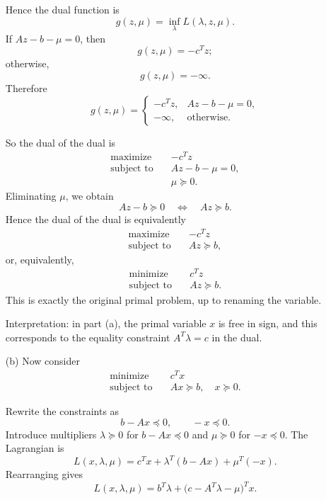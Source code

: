 \documentclass[11pt,letter,notitlepage]{article}
\theoremstyle{definition}
\begin{document}
\begin{solution}
\begin{enumerate}
    Hence the dual function is
    \[
    g(z,\mu)=\inf_\lambda L(\lambda,z,\mu).
    \]
    If $Az-b-\mu=0$, then
    \[
    g(z,\mu)=-c^T z;
    \]
    otherwise,
    \[
    g(z,\mu)=-\infty.
    \]
    Therefore
    \[
    g(z,\mu)=
    \begin{cases}
        -c^T z, & Az-b-\mu=0,\\
        -\infty, & \text{otherwise}.
    \end{cases}
    \]

    So the dual of the dual is
    \[
    \begin{aligned}
        \text{maximize}\quad & -c^T z\\
        \text{subject to}\quad & Az-b-\mu=0,\\
        & \mu \succeq 0.
    \end{aligned}
    \]
    Eliminating $\mu$, we obtain
    \[
    Az-b \succeq 0
    \quad\Longleftrightarrow\quad
    Az \succeq b.
    \]
    Hence the dual of the dual is equivalently
    \[
    \begin{aligned}
        \text{maximize}\quad & -c^T z\\
        \text{subject to}\quad & Az \succeq b,
    \end{aligned}
    \]
    or, equivalently,
    \[
    \begin{aligned}
        \text{minimize}\quad & c^T z\\
        \text{subject to}\quad & Az \succeq b.
    \end{aligned}
    \]
    This is exactly the original primal problem, up to renaming the
    variable.

    \medskip
    Interpretation: in part (a), the primal variable $x$ is free in sign,
    and this corresponds to the equality constraint $A^T\lambda=c$ in the
    dual.

    \item[(b)] Now consider
    \[
    \begin{aligned}
        \text{minimize}\quad & c^T x\\
        \text{subject to}\quad & Ax \succeq b,\quad x \succeq 0.
    \end{aligned}
    \]

    Rewrite the constraints as
    \[
    b-Ax \preceq 0,\qquad -x \preceq 0.
    \]
    Introduce multipliers $\lambda \succeq 0$ for $b-Ax\preceq 0$ and
    $\mu \succeq 0$ for $-x\preceq 0$. The Lagrangian is
    \[
    L(x,\lambda,\mu)
    =c^T x+\lambda^T(b-Ax)+\mu^T(-x).
    \]
    Rearranging gives
    \[
    L(x,\lambda,\mu)
    =b^T\lambda+\bigl(c-A^T\lambda-\mu\bigr)^T x.
    \]


\end{enumerate}
\end{solution}
\end{document}
